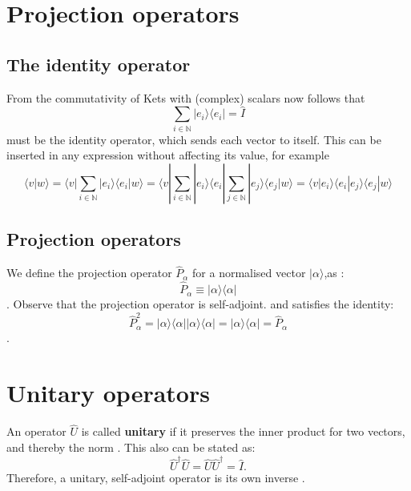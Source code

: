  \section{Projection operators}
 \subsection{The identity operator}
 
 From the commutativity of Kets with (complex) scalars now follows that
 \begin{equation}
 \sum_{i \in \mathbb{N}} | e_i \rangle \langle e_i | = \hat{I}
 \end{equation}
 must be the identity operator, which sends each vector to itself. This can be inserted in any expression without affecting its value, for example
 \begin{equation} \langle v | w \rangle = \langle v | \sum_{i \in \mathbb{N}} | e_i \rangle \langle e_i | w \rangle = \langle v | \sum_{i \in \mathbb{N}} | e_i \rangle \langle e_i | \sum_{j \in \mathbb{N}} | e_j \rangle \langle e_j | w \rangle = \langle v | e_i \rangle \langle e_i | e_j \rangle \langle e_j | w \rangle \end{equation} 
 \subsection{ Projection operators}
 We define the projection operator  $ \hat{P}_\alpha $ for a normalised vector $ | \alpha\rangle$,as :
 \begin{equation}
 \hat{P}_\alpha\equiv  | \alpha\rangle\langle \alpha |
 \end{equation}.
 Observe that the projection operator is self-adjoint. and satisfies the identity:
 \begin{equation}
 \hat{P}_\alpha ^2 = | \alpha\rangle\langle \alpha || \alpha\rangle\langle \alpha | = | \alpha\rangle\langle \alpha | = \hat{P}_\alpha 
 \end{equation}.
 \section{Unitary operators}
 An operator $ \hat{U}$ is called \textbf{unitary} if it preserves the inner product for two vectors, and thereby the norm . This also can be stated as:
 \begin{equation}
 \hat{U}^\dagger \hat{U} =     \hat{U}\hat{U}^\dagger  = \hat{I}.
 \end{equation}
 Therefore, a unitary, self-adjoint operator is its own inverse .
